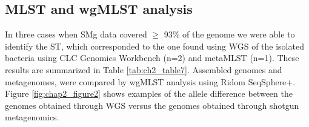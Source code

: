 \subsection{MLST and wgMLST analysis}
 
In three cases when \ac{SMg} data covered $\geq$ 93\% of the genome we were able to identify the ST, which corresponded to the one found using \ac{WGS} of the isolated bacteria using CLC Genomics Workbench (n=2) and metaMLST (n=1). 
These results are summarized in Table \ref{tab:ch2_table7}.
Assembled genomes and metagenomes, were compared by wgMLST analysis using Ridom SeqSphere+. 
Figure \ref{fig:chap2_figure2} shows examples of the allele difference between the genomes obtained through \ac{WGS} versus the genomes obtained through shotgun metagenomics.

\begin{table}[]
\caption{Results of MLST using by whole genome sequencing and shotgun metagenomics}
\label{tab:ch2_table7}
\end{table}
